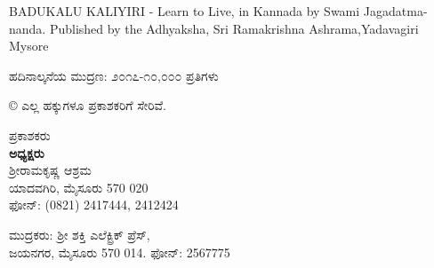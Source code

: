 \thispagestyle{empty}

\begin{center}
BADUKALU KALIYIRI - Learn to Live, in Kannada by Swami Jagadatma- nanda. Published by the Adhyaksha, Sri Ramakrishna Ashrama,Yadavagiri Mysore
\end{center}

\begin{center}
ಹದಿನಾಲ್ಕನೆಯ ಮುದ್ರಣ: ೨೦೧೭-೧೦,೦೦೦ ಪ್ರತಿಗಳು 
\end{center}

\begin{center}
© ಎಲ್ಲ ಹಕ್ಕುಗಳೂ ಪ್ರಕಾಶಕರಿಗೆ ಸೇರಿವೆ.
\end{center}

\begin{center}
ಪ್ರಕಾಶಕರು\\\textbf{ಅಧ್ಯಕ್ಷರು}\\ಶ್ರೀರಾಮಕೃಷ್ಣ ಆಶ್ರಮ\\ಯಾದವಗಿರಿ, ಮೈಸೂರು 570 020\\ಫೋನ್​: (0821) 2417444, 2412424
\end{center}

\begin{center}
ಮುದ್ರಕರು: ಶ್ರೀ ಶಕ್ತಿ ಎಲೆಕ್ಟ್ರಿಕ್ ಪ್ರೆಸ್,\\ಜಯನಗರ, ಮೈಸೂರು 570 014. ಫೋನ್​: 2567775
\end{center}

